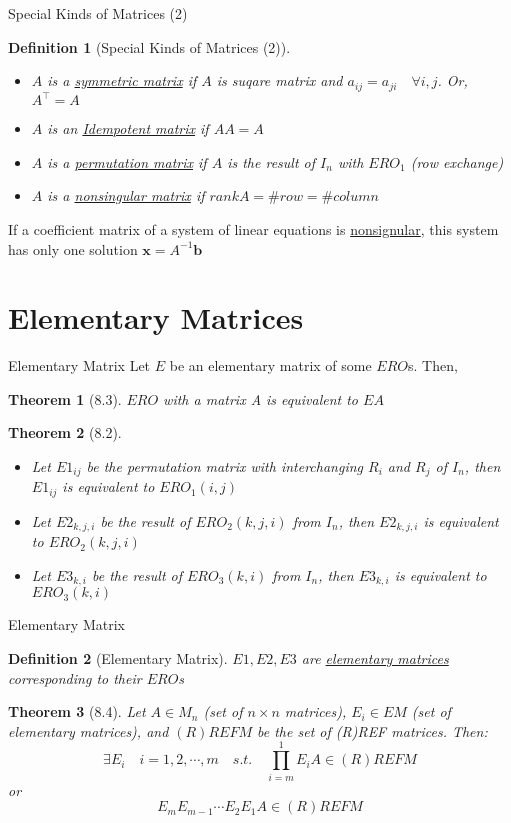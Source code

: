 \documentclass[final]{beamer}
\newtheorem{defn}{Definition}
\newtheorem{thm}{Theorem}
\begin{document}
\begin{frame}[t]{Special Kinds of Matrices (2)}
	\begin{defn}
		[Special Kinds of Matrices (2)]
		\begin{itemize}
			\item $A$ is a \uline{symmetric matrix} if $A$ is suqare matrix and $a_{ij}=a_{ji}\quad\forall i,j$. Or, $A^\intercal = A$
			\item $A$ is an \uline{Idempotent matrix} if $AA=A$
			\item $A$ is a \uline{permutation matrix} if $A$ is the result of $I_n$ with $ERO_1$ (row exchange)
			\item $A$ is a \uline{nonsingular matrix} if $rank A = \# row = \# column$
		\end{itemize}
	\end{defn}
	If a coefficient matrix of a system of linear equations is \uline{nonsignular}, this system has only one solution $\mathbf{x} = A^{-1}\mathbf{b}$
\end{frame}

\section{Elementary Matrices} %
\label{sec:elementary_matrices}
\begin{frame}[t]{Elementary Matrix}
	Let $E$ be an elementary matrix of some $ERO$s. Then, 
	\begin{thm}
		[8.3] $ERO$ with a matrix A is equivalent to $EA$
	\end{thm}
	\begin{thm}
		[8.2] \begin{itemize}
			\item Let $E1_{ij}$ be the permutation matrix with interchanging $R_i$ and $R_j$ of $I_n$, then $E1_{ij}$ is equivalent to $ERO_1(i,j)$
			\item Let $E2_{k,j,i}$ be the result of $ERO_2(k,j,i)$ from $I_n$, then $E2_{k,j,i}$ is equivalent to $ERO_2(k,j,i)$
			\item Let $E3_{k,i}$ be the result of $ERO_3(k,i)$ from $I_n$, then $E3_{k,i}$ is equivalent to $ERO_3(k,i)$
		\end{itemize}
	\end{thm}
\end{frame}
\begin{frame}[t]{Elementary Matrix}
	\begin{defn}
		[Elementary Matrix]
		$E1,E2,E3$ are \uline{elementary matrices} corresponding to their $ERO$s
	\end{defn}
	\begin{thm}
		[8.4] Let $A\in M_n$ (set of $n\times n$ matrices), $E_i\in EM$ (set of elementary matrices), and $(R)REFM$ be the set of (R)REF matrices. Then: \[
			\exists E_i\quad i=1,2,\cdots,m\quad s.t.\quad \prod_{i=m}^1E_i A \in (R)REFM
		\] or \[
			E_m E_{m-1}\cdots E_2E_1 A \in (R)REFM
		\]
	\end{thm}
\end{frame}
\end{document}
